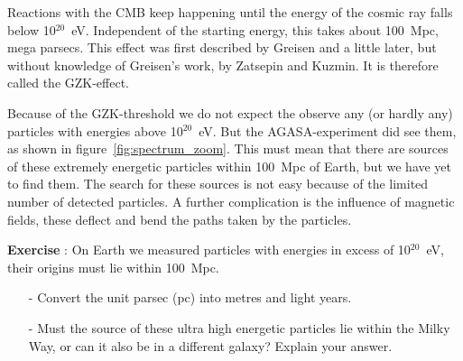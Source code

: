 \documentclass[12pt,a4paper]{article}
\numberwithin{equation}{section}
\numberwithin{figure}{section}
\newcounter{Exercise}
\numberwithin{table}{section}
\begin{document}
Reactions with the CMB keep happening until the energy of the cosmic ray falls below 10$^{20}$~eV. Independent of the starting energy, this takes about 100~Mpc, mega parsecs. This effect was first described by Greisen and a little later, but without knowledge of Greisen's work, by Zatsepin and Kuzmin. It is therefore called the GZK-effect.

Because of the GZK-threshold we do not expect the observe any (or hardly any) particles with energies above 10$^{20}$~eV. But the AGASA-experiment did see them, as shown in figure~\ref{fig:spectrum_zoom}. This must mean that there are sources of these extremely energetic particles within 100~Mpc of Earth, but we have yet to find them. The search for these sources is not easy because of the limited number of detected particles. A further complication is the influence of magnetic fields, these deflect and bend the paths taken by the particles. 

\begin{shaded}
\textbf{Exercise \theExercise {}} : On Earth we measured particles with energies in excess of 10$^{20}$~eV, their origins must lie within 100~Mpc.
\begin{itemize}
\item[-] Convert the unit parsec (pc) into metres and light years.
\item[-] Must the source of these ultra high energetic particles lie within the Milky Way, or can it also be in a different galaxy? Explain your answer.
\end{itemize}\end{shaded}
\end{document}
